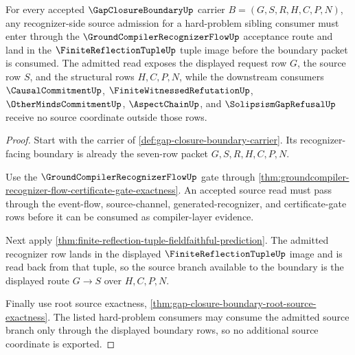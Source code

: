 \begin{theorem}
\label{thm:gap-closure-boundary-recognizer-source-admission}
For every accepted $\GapClosureBoundaryUp$ carrier $B=(G,S,R,H,C,P,N)$, any recognizer-side source admission for a hard-problem sibling consumer must enter through the $\GroundCompilerRecognizerFlowUp$ acceptance route and land in the $\FiniteReflectionTupleUp$ tuple image before the boundary packet is consumed. The admitted read exposes the displayed request row $G$, the source row $S$, and the structural rows $H,C,P,N$, while the downstream consumers $\CausalCommitmentUp$, $\FiniteWitnessedRefutationUp$, $\OtherMindsCommitmentUp$, $\AspectChainUp$, and $\SolipsismGapRefusalUp$ receive no source coordinate outside those rows.
\end{theorem}
\begin{proof}
Start with the carrier of \autoref{def:gap-closure-boundary-carrier}. Its recognizer-facing boundary is already the seven-row packet $G,S,R,H,C,P,N$.

Use the $\GroundCompilerRecognizerFlowUp$ gate through \autoref{thm:groundcompiler-recognizer-flow-certificate-gate-exactness}. An accepted source read must pass through the event-flow, source-channel, generated-recognizer, and certificate-gate rows before it can be consumed as compiler-layer evidence.

Next apply \autoref{thm:finite-reflection-tuple-fieldfaithful-prediction}. The admitted recognizer row lands in the displayed $\FiniteReflectionTupleUp$ image and is read back from that tuple, so the source branch available to the boundary is the displayed route $G \longrightarrow S$ over $H,C,P,N$.

Finally use root source exactness, \autoref{thm:gap-closure-boundary-root-source-exactness}. The listed hard-problem consumers may consume the admitted source branch only through the displayed boundary rows, so no additional source coordinate is exported.
\end{proof}

